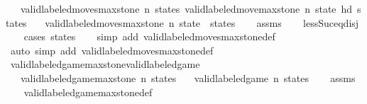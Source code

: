 \begin{isabellebody}
\ \ \ {\isachardoublequoteopen}valid{\isacharunderscore}labeled{\isacharunderscore}moves{\isacharunderscore}max{\isacharunderscore}stone\ n\ states{\isachardoublequoteclose}\ {\isachardoublequoteopen}valid{\isacharunderscore}labeled{\isacharunderscore}move{\isacharunderscore}max{\isacharunderscore}stone\ n\ state\ {\isacharparenleft}hd\ states{\isacharparenright}{\isachardoublequoteclose}\isanewline
\ \ \ {\isachardoublequoteopen}valid{\isacharunderscore}labeled{\isacharunderscore}moves{\isacharunderscore}max{\isacharunderscore}stone\ n\ {\isacharparenleft}state\ {\isacharhash}\ states{\isacharparenright}{\isachardoublequoteclose}\isanewline
%
\isadelimproof
\ \ %
\endisadelimproof
%
\isatagproof
{}\isamarkupfalse%
\ assms\isanewline
\ \ \isamarkupfalse%
\ less{\isacharunderscore}Suc{\isacharunderscore}eq{\isacharunderscore}{}{\isacharunderscore}disj\isanewline
\ \ \isamarkupfalse%
\ {\isacharparenleft}cases\ states{\isacharparenright}\isanewline
\ \ \isamarkupfalse%
\ {\isacharparenleft}simp\ add{\isacharcolon}\ valid{\isacharunderscore}labeled{\isacharunderscore}moves{\isacharunderscore}max{\isacharunderscore}stone{\isacharunderscore}def{\isacharparenright}\isanewline
\ \ \isamarkupfalse%
\ {\isacharparenleft}auto\ simp\ add{\isacharcolon}\ valid{\isacharunderscore}labeled{\isacharunderscore}moves{\isacharunderscore}max{\isacharunderscore}stone{\isacharunderscore}def{\isacharparenright}\isanewline
\ \ \isamarkupfalse%
%
\endisatagproof
{\isafoldproof}%
%
\isadelimproof
\isanewline
%
\endisadelimproof
\isanewline
{}\isamarkupfalse%
\ valid{\isacharunderscore}labeled{\isacharunderscore}game{\isacharunderscore}max{\isacharunderscore}stone{\isacharunderscore}valid{\isacharunderscore}labeled{\isacharunderscore}game{\isacharcolon}\isanewline
\ \ \ {\isachardoublequoteopen}valid{\isacharunderscore}labeled{\isacharunderscore}game{\isacharunderscore}max{\isacharunderscore}stone\ n\ states{\isachardoublequoteclose}\isanewline
\ \ \ {\isachardoublequoteopen}valid{\isacharunderscore}labeled{\isacharunderscore}game\ n\ states{\isachardoublequoteclose}\isanewline
%
\isadelimproof
\ \ %
\endisadelimproof
%
\isatagproof
{}\isamarkupfalse%
\ assms\isanewline
\ \ \isamarkupfalse%
\ valid{\isacharunderscore}labeled{\isacharunderscore}game{\isacharunderscore}max{\isacharunderscore}stone{\isacharunderscore}def\isanewline
\ \ \isamarkupfalse%

\end{isabellebody}
